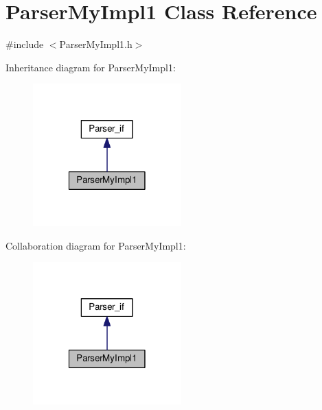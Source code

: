 \hypertarget{class_parser_my_impl1}{\section{Parser\-My\-Impl1 Class Reference}
\label{class_parser_my_impl1}
}


{\ttfamily \#include $<$Parser\-My\-Impl1.\-h$>$}



Inheritance diagram for Parser\-My\-Impl1\-:\nopagebreak
\begin{figure}[H]
\begin{center}
\leavevmode
\includegraphics[width=162pt]{class_parser_my_impl1__inherit__graph}
\end{center}
\end{figure}


Collaboration diagram for Parser\-My\-Impl1\-:\nopagebreak
\begin{figure}[H]
\begin{center}
\leavevmode
\includegraphics[width=162pt]{class_parser_my_impl1__coll__graph}
\end{center}
\end{figure}
